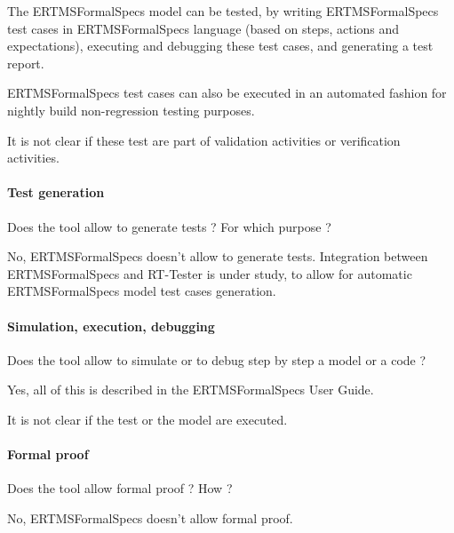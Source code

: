 \begin{author_comment}
The ERTMSFormalSpecs model can be tested, by writing ERTMSFormalSpecs test cases in ERTMSFormalSpecs language (based on steps, actions and expectations), executing and debugging these test cases, and generating a test report. 

ERTMSFormalSpecs test cases can also be executed in an automated fashion for nightly build non-regression testing purposes.
\end{author_comment}



\begin{assessor2}
It is not clear if these test are part of validation activities or verification activities.
\end{assessor2}


\paragraph{Test generation}
Does the tool allow to generate tests ? For  which purpose ?

\begin{author_comment}
No, ERTMSFormalSpecs doesn't allow to generate tests. Integration between ERTMSFormalSpecs and RT-Tester is under study, to allow for automatic ERTMSFormalSpecs model test cases generation.
\end{author_comment}

\paragraph{Simulation, execution, debugging}
Does the tool allow to simulate or to debug step by step a model or a code ?

\begin{author_comment}
Yes, all of this is described in the ERTMSFormalSpecs User Guide.
\end{author_comment}


\begin{assessor2}
It is not clear if the test or the model are executed.
\end{assessor2}



\paragraph{Formal proof}
Does the tool allow formal proof ?  How ?

\begin{author_comment}
No, ERTMSFormalSpecs doesn't allow formal proof. 
\end{author_comment}

